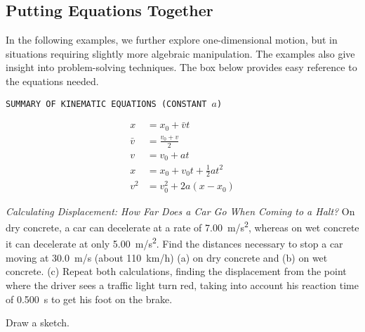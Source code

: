 \documentclass[main-ap-physics.tex]{subfiles}
\begin{document}
\subsection*{Putting Equations Together}

In the following examples, we further explore one-dimensional motion, but in situations requiring slightly more algebraic manipulation. The examples also give insight into problem-solving techniques. The box below provides easy reference to the equations needed.

\vspace{1em}

\cyanhrule

\begin{center}
    \texttt{SUMMARY OF KINEMATIC EQUATIONS (CONSTANT $a$)}
\end{center}

\vspace{-2em}

\begin{align}
    x &= x_0 + \bar{v} t \label{X0SPQW} \\[1ex]
    \bar{v} &= \frac{v_0 + v}{2} \\[1ex]
    v &= v_0 + at \\[1ex]
    x &= x_0 + v_0t + \frac{1}{2} a t^2 \\[1ex]
    v^2 &= v_0^2 + 2a (x - x_0) \label{EEJoew}
\end{align}

\cyanhrule

\begin{example}
    \textit{Calculating Displacement: How Far Does a Car Go When Coming to a Halt?} On dry concrete, a car can decelerate at a rate of \SI{7.00}{m/s^2}, whereas on wet concrete it can decelerate at only \SI{5.00}{m/s^2}. Find the distances necessary to stop a car moving at \SI{30.0}{m/s} (about \SI{110}{km/h}) (a) on dry concrete and (b) on wet concrete. (c) Repeat both calculations, finding the displacement from the point where the driver sees a traffic light turn red, taking into account his reaction time of \SI{0.500}{s} to get his foot on the brake.
\end{example}

\Solution Draw a sketch.

\begin{center}
\end{center}
\end{document}
